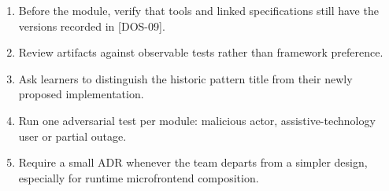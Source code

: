 \documentclass[11pt]{article}
\begin{document}
\begin{enumerate}
\item Before the module, verify that tools and linked specifications still have the versions recorded in [DOS-09].
\item Review artifacts against observable tests rather than framework preference.
\item Ask learners to distinguish the historic pattern title from their newly proposed implementation.
\item Run one adversarial test per module: malicious actor, assistive-technology user or partial outage.
\item Require a small ADR whenever the team departs from a simpler design, especially for runtime microfrontend composition.
\end{enumerate}


\clearpage

\end{document}

